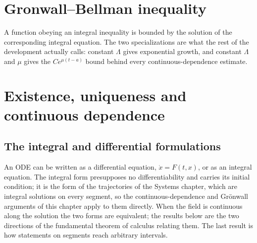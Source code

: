 \section{Gronwall--Bellman inequality}

A function obeying an integral inequality is bounded by the solution of the corresponding
integral equation. The two specializations are what the rest of the development actually calls:
constant $\Lambda$ gives exponential growth, and constant $\Lambda$ and $\mu$ gives the
$C e^{\mu(t-a)}$ bound behind every continuous-dependence estimate.




\section{Existence, uniqueness and continuous dependence}






\subsection{The integral and differential formulations}

An ODE can be written as a differential equation, $\dot x = F(t,x)$, or as an integral equation.
The integral form presupposes no differentiability and carries its initial condition; it is the
form of the trajectories of the Systems chapter, which are integral solutions on every segment,
so the continuous-dependence and Gr\"onwall arguments of this chapter apply to them directly.
When the field is continuous along the solution the two forms are equivalent; the results below
are the two directions of the fundamental theorem of calculus relating them.  The last result is
how statements on segments reach arbitrary intervals.



